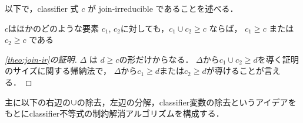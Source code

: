 以下で，classifier 式 $c$ が join-irreducible であることを述べる．
\begin{theo}
  \label{theo:join-ir}
  $c$はほかのどのような要素 $c_1$, $c_2$に対しても，$c_1 \cup c_2 \ge c$ ならば，
  $c_1 \ge c$ または $c_2 \ge c$ である
\end{theo}

\begin{proof}[\ref{theo:join-ir}の証明]
  $\Delta$ は $d\ge c$の形だけからなる．
  $\Delta$から$c_1 \cup c_2 \ge d$を導く証明のサイズに関する帰納法で，
  $\Delta$から$c_1 \ge d$または$c_2 \ge d$が導けることが言える．
\end{proof}

主に以下の右辺の$\cup$の除去，左辺の分解，classifier変数の除去というアイデアをもとにclassifier不等式の制約解消アルゴリズムを構成する．

